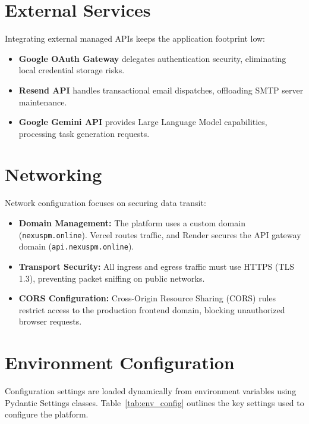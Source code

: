 \section{External Services}
Integrating external managed APIs keeps the application footprint low:
\begin{itemize}
    \item \textbf{Google OAuth Gateway} delegates authentication security, eliminating local credential storage risks.
    \item \textbf{Resend API} handles transactional email dispatches, offloading SMTP server maintenance.
    \item \textbf{Google Gemini API} provides Large Language Model capabilities, processing task generation requests.
\end{itemize}

\section{Networking}
Network configuration focuses on securing data transit:
\begin{itemize}
    \item \textbf{Domain Management:} The platform uses a custom domain (\texttt{nexuspm.online}). Vercel routes traffic, and Render secures the API gateway domain (\texttt{api.nexuspm.online}).
    \item \textbf{Transport Security:} All ingress and egress traffic must use HTTPS (TLS 1.3), preventing packet sniffing on public networks.
    \item \textbf{CORS Configuration:} Cross-Origin Resource Sharing (CORS) rules restrict access to the production frontend domain, blocking unauthorized browser requests.
\end{itemize}

\section{Environment Configuration}
Configuration settings are loaded dynamically from environment variables using Pydantic Settings classes. Table~\ref{tab:env_config} outlines the key settings used to configure the platform.


